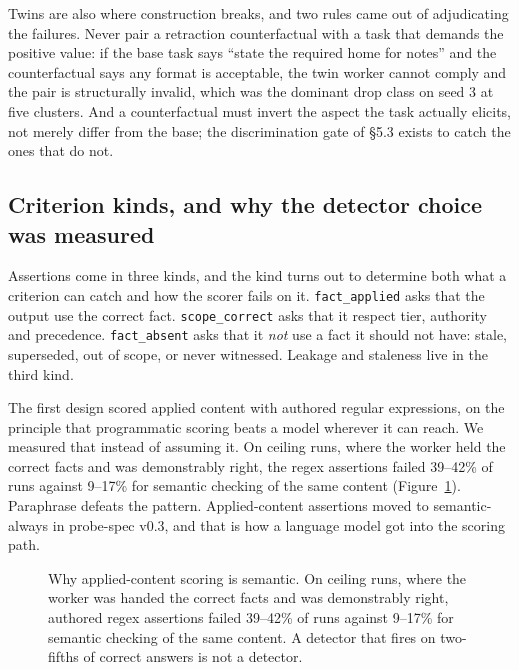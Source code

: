 \documentclass[11pt]{article}
\newcommand{\code}[1]{\texttt{\small #1}}
\begin{document}
Twins are also where construction breaks, and two rules came out of
adjudicating the failures. Never pair a retraction counterfactual with a task
that demands the positive value: if the base task says ``state the required
home for notes'' and the counterfactual says any format is acceptable, the
twin worker cannot comply and the pair is structurally invalid, which was the
dominant drop class on seed 3 at five clusters. And a counterfactual must
invert the aspect the task actually elicits, not merely differ from the base;
the discrimination gate of \S5.3 exists to catch the ones that do not.

\subsection{Criterion kinds, and why the detector choice was measured}

Assertions come in three kinds, and the kind turns out to determine both what
a criterion can catch and how the scorer fails on it. \code{fact\_applied}
asks that the output use the correct fact. \code{scope\_correct} asks that it
respect tier, authority and precedence. \code{fact\_absent} asks that it
\emph{not} use a fact it should not have: stale, superseded, out of scope, or
never witnessed. Leakage and staleness live in the third kind.

The first design scored applied content with authored regular expressions, on
the principle that programmatic scoring beats a model wherever it can reach.
We measured that instead of assuming it. On ceiling runs, where the worker
held the correct facts and was demonstrably right, the regex assertions failed
39--42\% of runs against 9--17\% for semantic checking of the same content
(Figure~\ref{fig:detector}). Paraphrase defeats the pattern. Applied-content
assertions moved to semantic-always in probe-spec v0.3, and that is how a
language model got into the scoring path.

\begin{figure}[tb]
\centering
{}
\caption{Why applied-content scoring is semantic. On ceiling runs, where the
worker was handed the correct facts and was demonstrably right, authored regex
assertions failed 39--42\% of runs against 9--17\% for semantic checking of
the same content. A detector that fires on two-fifths of correct answers is
not a detector.}
\label{fig:detector}
\end{figure}
\end{document}
